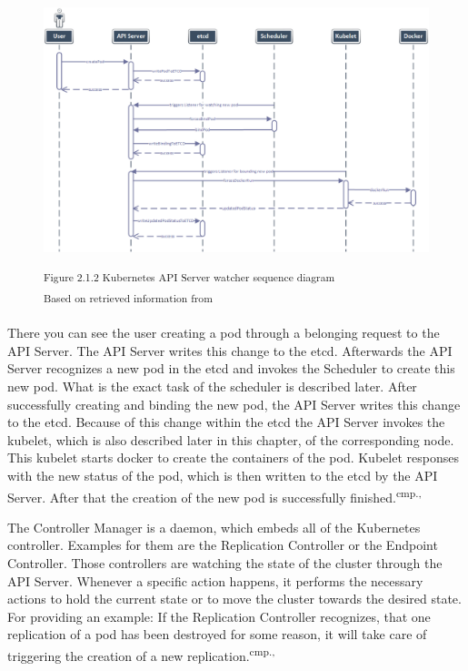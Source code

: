 \begin{figure}[h]
\centering
\includegraphics[width=\textwidth]{images/kubernetes_watcher_sequence.png}

\textsuperscript{Figure 2.1.2 Kubernetes API Server watcher sequence diagram}\\
\textsuperscript{Based on retrieved information from \cite{16}}
\end{figure}

There you can see the user creating a pod through a belonging request to the API Server. The API Server writes this change to the etcd. Afterwards the API Server recognizes a new pod in the etcd and invokes the Scheduler to create this new pod. What is the exact task of the scheduler is described later. After successfully creating and binding the new pod, the API Server writes this change to the etcd. Because of this change within the etcd the API Server invokes the kubelet, which is also described later in this chapter, of the corresponding node. This kubelet starts docker to create the containers of the pod. Kubelet responses with the new status of the pod, which is then written to the etcd by the API Server. After that the creation of the new pod is successfully finished.\textsuperscript{cmp.\cite{13}, \cite{16}}

The Controller Manager is a daemon, which embeds all of the Kubernetes controller. Examples for them are the Replication Controller or the Endpoint Controller. Those controllers are watching the state of the cluster through the API Server. Whenever a specific action happens, it performs the necessary actions to hold the current state or to move the cluster towards the desired state. For providing an example: If the Replication Controller recognizes, that one replication of a pod has been destroyed for some reason, it will take care of triggering the creation of a new replication.\textsuperscript{cmp.\cite{13}, \cite{16}}


